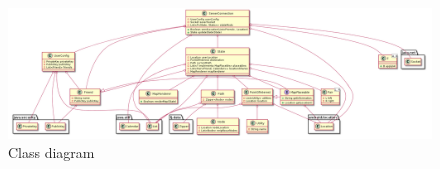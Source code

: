\documentclass[10pt,oneside,notitlepage]{report}
\begin{document}
\begin{figure}[H]
 \centering
 \includegraphics[keepaspectratio, scale=0.6]{class.png}
 \caption{Class diagram}
\end{figure}
\end{document}
